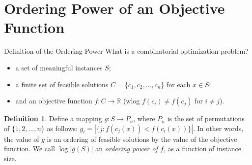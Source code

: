 \documentclass[handout,notheorems]{beamer}
\theoremstyle{definition}
\newtheorem*{definition}{\textbf{Definition}}
\begin{document}
\section{Ordering Power of an Objective Function}

\begin{frame}{Definition of the Ordering Power}
    What is a combinatorial optimization problem?
    \begin{itemize}
        \item a set of meaningful instances $S$;
        \item a finite set of feasible solutions $C = \{c_1, c_2, \dots, c_n\}$ for each $x \in S$;
        \item and an objective function $f: C \to \mathbb{R}$ (wlog $f(c_i) \ne f(c_j)$ for $i \ne j$).
    \end{itemize}
    \pause
    \begin{definition}
        Define a mapping $g: S \to P_n$, where $P_n$ is the set of permutations of $\{1, 2, \dots, n\}$ as follows: $g_i = |\{j: f(c_j(x)) < f(c_i(x))\}|$. In other words, the value of $g$ is an ordering of feasible solutions by the value of the objective function. We call $\log |g(S)|$ an \emph{ordering power of $f$}, as a function of instance size.
    \end{definition}
\end{frame}
\end{document}
